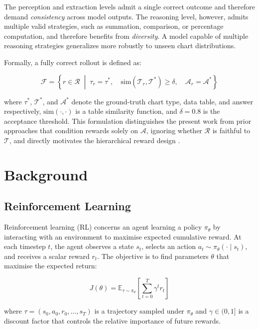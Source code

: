 \documentclass{iutbscthesis}
\begin{document}
The perception and extraction levels admit a single correct outcome and therefore demand \textit{consistency} across model outputs. The reasoning level, however, admits multiple valid strategies, such as summation, comparison, or percentage computation, and therefore benefits from \textit{diversity}. A model capable of multiple reasoning strategies generalizes more robustly to unseen chart distributions.

Formally, a fully correct rollout is defined as:

\begin{equation}
    \mathcal{F} = \left\{ r \in \mathcal{R} \;\middle|\; \tau_r = \tau^*, \quad \text{sim}(\mathcal{T}_r, \mathcal{T}^*) \geq \delta, \quad \mathcal{A}_r = \mathcal{A}^* \right\}
\end{equation}

\noindent where $\tau^*$, $\mathcal{T}^*$, and $\mathcal{A}^*$ denote the ground-truth chart type, data table, and answer respectively, $\text{sim}(\cdot,\cdot)$ is a table similarity function, and $\delta = 0.8$ is the acceptance threshold. This formulation distinguishes the present work from prior approaches that condition rewards solely on $\mathcal{A}$, ignoring whether $\mathcal{R}$ is faithful to $\mathcal{T}$, and directly motivates the hierarchical reward design .

\section{Background}

\subsection{Reinforcement Learning}

Reinforcement learning (RL) concerns an agent learning a policy $\pi_\theta$ by interacting
with an environment to maximise expected cumulative reward. At each timestep $t$, the
agent observes a state $s_t$, selects an action $a_t \sim \pi_\theta(\cdot \mid s_t)$, and receives a scalar
reward $r_t$. The objective is to find parameters $\theta$ that maximise the expected return:

\begin{equation}
    J(\theta) = \mathbb{E}_{\tau \sim \pi_\theta}\!\left[\sum_{t=0}^{T} \gamma^t r_t\right]
\end{equation}

\noindent where $\tau = (s_0, a_0, r_0, \ldots, s_T)$ is a trajectory sampled under $\pi_\theta$ and
$\gamma \in (0,1]$ is a discount factor that controls the relative importance of future rewards.
\end{document}
